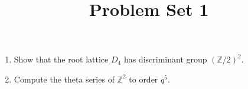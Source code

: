 \documentclass{article}
\title{Problem Set 1}
\date{}
\begin{document}
\maketitle
\begin{enumerate}
\item Show that the root lattice $D_4$ has discriminant group $(\mathbb{Z}/2)^2$.
\item Compute the theta series of $\mathbb{Z}^2$ to order $q^5$.
\end{enumerate}
\end{document}
